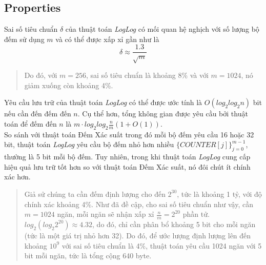\documentclass[a4paper,13pt]{article}
\theoremstyle{mytheor}
\begin{document}
\subsection*{Properties}
Sai số tiêu chuẩn $\delta$ của thuật toán \textit{LogLog} có mối quan hệ nghịch với số lượng bộ đếm sử dụng $m$ và có thể được xấp xỉ gần như là
\[\delta \approx \frac{1.3}{\sqrt{m}}\]
\vspace{0.25cm}
\begin{quote}
    Do đó, với $m = 256$, sai số tiêu chuẩn là khoảng 8\% và với $m = 1024$, nó giảm xuống còn khoảng 4\%.
    \vspace{0.25cm}
\end{quote}
\vspace{0.25cm}
\indent Yêu cầu lưu trữ của thuật toán \textit{LogLog} có thể được ước tính là $O(log_2log_2n)$ bit nếu cần đến đếm đến $n$. Cụ thể hơn, 
tổng không gian được yêu cầu bởi thuật toán để đếm đến $n$ là $m\cdot log_2log_2\frac{n}{m}(1 + O(1))$.\\
So sánh với thuật toán Đếm Xác suất trong đó mỗi bộ đếm yêu cầu 16 hoặc 32 bit, thuật toán \textit{LogLog} yêu cầu bộ đếm nhỏ hơn 
nhiều $\{COUNTER[j]\}_{j=0}^{m-1}$, thường là 5 bit mỗi bộ đếm. Tuy nhiên, trong khi thuật toán \textit{LogLog} cung cấp hiệu quả lưu trữ tốt hơn 
so với thuật toán Đếm Xác suất, nó đôi chút ít chính xác hơn.\\

\begin{quote}
    Giả sử chúng ta cần đếm định lượng cho đến $2^{30}$, tức là khoảng 1 tỷ, với độ chính xác khoảng 4\%. Như đã đề cập, cho sai số tiêu chuẩn như vậy, 
    cần $m = 1024$ ngăn, mỗi ngăn sẽ nhận xấp xỉ $\frac{n}{m} = 2^{20}$ phần tử.\\
    $log_2\left(log_{2}2^{20}\right) \approx 4.32$, do đó, chỉ cần phân bổ khoảng 5 bit cho mỗi ngăn (tức là một giá trị nhỏ hơn 32). 
    Do đó, để ước lượng định lượng lên đến khoảng $10^9$ với sai số tiêu chuẩn là 4\%, thuật toán yêu cầu 1024 ngăn với 5 bit mỗi ngăn, 
    tức là tổng cộng 640 byte.
    \vspace{0.25cm}
\end{quote}
\vspace{0.25cm}
\end{document}
